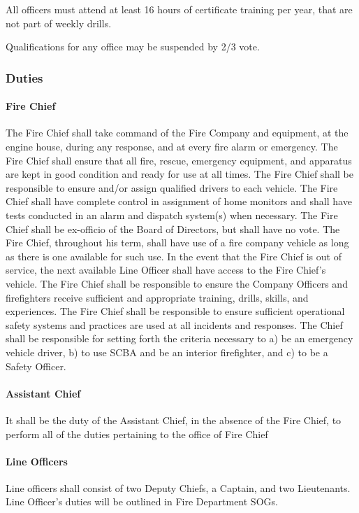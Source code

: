 ﻿\documentclass[12pt,letterpaper]{article}
\begin{document}
All officers must attend at least 16 hours of certificate training per year, that are not part of weekly drills.

Qualifications for any office may be suspended by 2/3 vote.

\subsubsection{Duties}
\paragraph{Fire Chief}
The Fire Chief shall take command of the Fire Company and equipment, at the engine house, during any response, and at every fire alarm or emergency. The Fire Chief shall ensure that all fire, rescue, emergency equipment, and apparatus are kept in good condition and ready for use at all times. The Fire Chief shall be responsible to ensure and/or assign qualified drivers to each vehicle. The Fire Chief shall have complete control in assignment of home monitors and shall have tests conducted in an alarm and dispatch system(s) when necessary. The Fire Chief shall be ex-officio of the Board of Directors, but shall have no vote. The Fire Chief, throughout his term, shall have use of a fire company vehicle as long as there is one available for such use. In the event that the Fire Chief is out of service, the next available Line Officer shall have access to the Fire Chief’s vehicle. The Fire Chief shall be responsible to ensure the Company Officers and firefighters receive sufficient and appropriate training, drills, skills, and experiences. The Fire Chief shall be responsible to ensure sufficient operational safety systems and practices are used at all incidents and responses. The Chief shall be responsible for setting forth the criteria necessary to a) be an emergency vehicle driver, b) to use SCBA and be an interior firefighter, and c) to be a Safety Officer.
\paragraph{Assistant Chief}
It shall be the duty of the Assistant Chief, in the absence of the Fire Chief, to perform all of the duties pertaining to the office of Fire Chief
\paragraph{Line Officers}
Line officers shall consist of two Deputy Chiefs, a Captain, and two Lieutenants.  Line Officer’s duties will be outlined in Fire Department SOGs.
\end{document}
